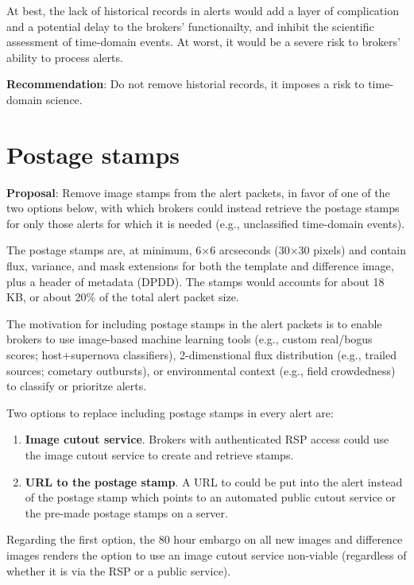 \documentclass[DM,authoryear,toc]{lsstdoc}
\begin{document}
At best, the lack of historical records in alerts would add a layer of complication and a potential delay to the brokers' 
functionailty, and inhibit the scientific assessment of time-domain events.
At worst, it would be a severe risk to brokers' ability to process alerts.

\textbf{Recommendation}: Do not remove historial records, it imposes a risk to time-domain science.


\section{Postage stamps}\label{sec:stamps}

\textbf{Proposal}: Remove image stamps from the alert packets, in favor of one of the two options below, 
with which brokers could instead retrieve the postage stamps for only those alerts for which it is needed 
(e.g., unclassified time-domain events).

The postage stamps are, at minimum, 6$\times$6 arcseconds (30$\times$30 pixels) and contain flux, variance, 
and mask extensions for both the template and difference image, plus a header of metadata (DPDD).
The stamps would accounts for about 18 KB, or about 20\% of the total alert packet size.

The motivation for including postage stamps in the alert packets is to enable brokers to use image-based 
machine learning tools (e.g., custom real/bogus scores; host+supernova classifiers), 2-dimenstional flux distribution 
(e.g., trailed sources; cometary outbursts), or environmental context (e.g., field crowdedness) to classify or prioritze alerts.

Two options to replace including postage stamps in every alert are:
\begin{enumerate}
\item \textbf{Image cutout service}. Brokers with authenticated RSP access could use the image cutout service to 
create and retrieve stamps.
\item \textbf{URL to the postage stamp}. A URL to could be put into the alert instead of the postage stamp which 
points to an automated public cutout service or the pre-made postage stamps on a server.
\end{enumerate}

Regarding the first option, the 80 hour embargo on all new images and difference images renders the option to use 
an image cutout service non-viable (regardless of whether it is via the RSP or a public service).
\end{document}
